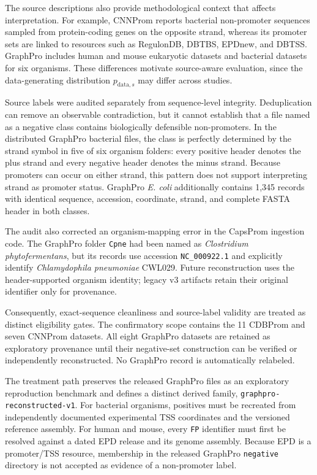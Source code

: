 The source descriptions also provide methodological context that affects interpretation. For example, CNNProm reports bacterial non-promoter sequences sampled from protein-coding genes on the opposite strand, whereas its promoter sets are linked to resources such as RegulonDB, DBTBS, EPDnew, and DBTSS. GraphPro includes human and mouse eukaryotic datasets and bacterial datasets for six organisms. These differences motivate source-aware evaluation, since the data-generating distribution $p_{\text{data},s}$ may differ across studies.

Source labels were audited separately from sequence-level integrity.
Deduplication can remove an observable contradiction, but it cannot establish
that a file named as a negative class contains biologically defensible
non-promoters. In the distributed GraphPro bacterial files, the class is
perfectly determined by the strand symbol in five of six organism folders:
every positive header denotes the plus strand and every negative header denotes
the minus strand. Because promoters can occur on either strand, this pattern
does not support interpreting strand as promoter status. GraphPro
\textit{E. coli} additionally contains 1,345 records with identical sequence,
accession, coordinate, strand, and complete FASTA header in both classes.

The audit also corrected an organism-mapping error in the CapsProm ingestion
code. The GraphPro folder \texttt{Cpne} had been named as
\textit{Clostridium phytofermentans}, but its records use accession
\texttt{NC\_000922.1} and explicitly identify \textit{Chlamydophila pneumoniae}
CWL029. Future reconstruction uses the header-supported organism identity;
legacy v3 artifacts retain their original identifier only for provenance.

Consequently, exact-sequence cleanliness and source-label validity are treated
as distinct eligibility gates. The confirmatory scope contains the 11 CDBProm
and seven CNNProm datasets. All eight GraphPro datasets are retained as
exploratory provenance until their negative-set construction can be verified or
independently reconstructed. No GraphPro record is automatically relabeled.

The treatment path preserves the released GraphPro files as an exploratory
reproduction benchmark and defines a distinct derived family,
\texttt{graphpro-reconstructed-v1}. For bacterial organisms, positives must be
recreated from independently documented experimental TSS coordinates and the
versioned reference assembly. For human and mouse, every \texttt{FP}
identifier must first be resolved against a dated EPD release and its genome
assembly. Because EPD is a promoter/TSS resource, membership in the released
GraphPro \texttt{negative} directory is not accepted as evidence of a
non-promoter label.

